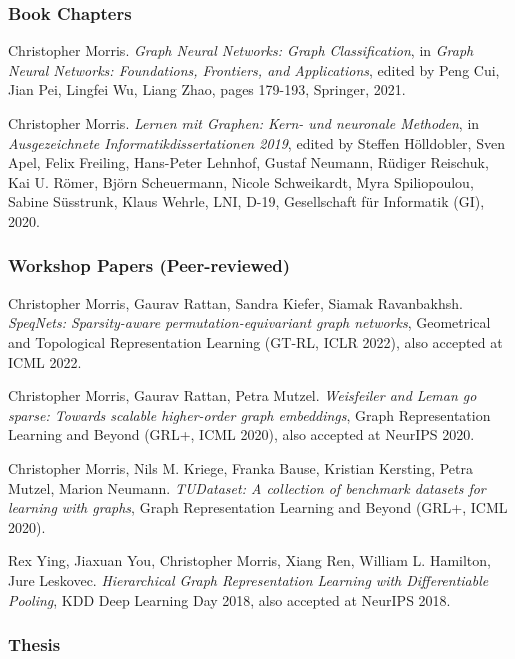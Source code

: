 \documentclass[11pt, a4paper, DIV=12]{scrartcl}
\begin{document}
\begin{thebibliography}{5}
\subsubsection*{Book Chapters}

Christopher Morris.
\emph{Graph Neural Networks: Graph Classification},
in \emph{Graph Neural Networks: Foundations, Frontiers, and Applications}, edited by Peng Cui, Jian Pei, Lingfei Wu, Liang Zhao, pages 179-193, Springer, 2021.

Christopher Morris.
\emph{Lernen mit Graphen: Kern- und neuronale Methoden}, in 
\emph{Ausgezeichnete Informatikdissertationen 2019}, edited by Steffen H{\"o}lldobler, Sven Apel, Felix Freiling, Hans-Peter Lehnhof, Gustaf Neumann, R{\"u}diger Reischuk, Kai U. R{\"o}mer, Bj{\"o}rn Scheuermann, Nicole Schweikardt, Myra Spiliopoulou, Sabine S{\"u}sstrunk, Klaus Wehrle, LNI, D-19, Gesellschaft f{\"u}r Informatik (GI), 2020. 

\subsubsection*{Workshop Papers (Peer-reviewed)}

Christopher Morris, Gaurav Rattan, Sandra Kiefer, Siamak Ravanbakhsh.
\emph{SpeqNets: Sparsity-aware permutation-equivariant graph networks},
Geometrical and Topological Representation Learning (GT-RL, ICLR 2022), also accepted at ICML 2022.

Christopher Morris, Gaurav Rattan, Petra Mutzel.
\emph{Weisfeiler and Leman go sparse: Towards scalable higher-order graph embeddings},
Graph Representation Learning and Beyond (GRL+, ICML 2020), also accepted at NeurIPS 2020.

Christopher Morris, Nils M. Kriege, Franka Bause, Kristian Kersting, Petra Mutzel, Marion Neumann.
\emph{TUDataset: A collection of benchmark datasets for learning with graphs},
Graph Representation Learning and Beyond (GRL+, ICML 2020).

Rex Ying, Jiaxuan You, Christopher Morris, Xiang Ren, William L. Hamilton, Jure Leskovec.
\emph{Hierarchical Graph Representation Learning with Differentiable Pooling},
KDD Deep Learning Day 2018, also accepted at NeurIPS 2018.

\subsubsection*{Thesis}


\end{thebibliography}
\end{document}
